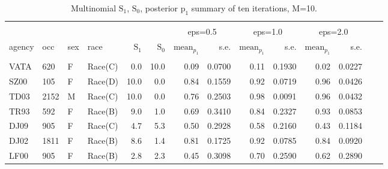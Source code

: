 \documentclass[10pt, letterpaper]{article}
\begin{document}
\begin{spacing}{1.0}
\begin{table}[h!]
    \centering
    \caption{Multinomial $\text{S}_1$, $\text{S}_0$, posterior $\text{p}_1$ summary of ten iterations, M=10.}
    \label{table:mn1-M10}
    \begin{tabular}{llllrrrrrrrrrr}
        \hline\\[-10pt]
        & & & & & & \multicolumn{2}{c}{eps=0.5} & \multicolumn{2}{c}{eps=1.0} & \multicolumn{2}{c}{eps=2.0} \\
        agency & occ & sex & race & $\text{S}_1$ & $\text{S}_0$ & $\text{mean}_{p_1}$ & s.e. & $\text{mean}_{p_1}$ & s.e. & $\text{mean}_{p_1}$ & s.e. \\ 
        \hline\\[-6pt]
        VATA & 620 & F & Race(C) & 0.0 & 10.0 & 0.09 & 0.0700 & 0.11 & 0.1930 & 0.02 & 0.0227 \\ 
        SZ00 & 105 & F & Race(D) & 10.0 & 0.0 & 0.84 & 0.1559 & 0.92 & 0.0719 & 0.96 & 0.0426 \\ 
        TD03 & 2152 & M & Race(C) & 10.0 & 0.0 & 0.76 & 0.2503 & 0.98 & 0.0091 & 0.96 & 0.0432 \\ 
        TR93 & 592 & F & Race(B) & 9.0 & 1.0 & 0.69 & 0.3410 & 0.84 & 0.2327 & 0.93 & 0.0853 \\ 
        DJ09 & 905 & F & Race(C) & 4.7 & 5.3 & 0.50 & 0.2928 & 0.58 & 0.2160 & 0.43 & 0.1184 \\ 
        DJ02 & 1811 & F & Race(B) & 8.6 & 1.4 & 0.81 & 0.1725 & 0.92 & 0.0785 & 0.84 & 0.0920 \\ 
        LF00 & 905 & F & Race(B) & 2.8 & 2.3 & 0.45 & 0.3098 & 0.70 & 0.2590 & 0.62 & 0.2890 \\ 
        \hline
    \end{tabular}
\end{table}


\end{spacing}
\end{document}
